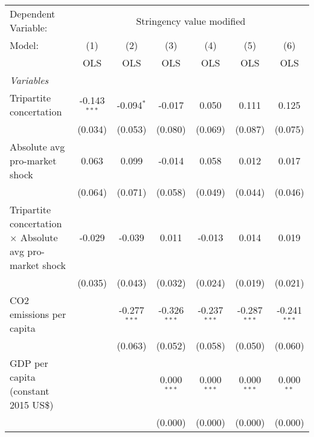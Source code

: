 
\begingroup
\centering
\begin{tabular}{lcccccc}
   \toprule
   Dependent Variable: & \multicolumn{6}{c}{Stringency value modified}\\
   Model:                                                          & (1)            & (2)            & (3)            & (4)            & (5)            & (6)\\  
                                                                   &  OLS           & OLS            & OLS            & OLS            & OLS            & OLS\\  
   \midrule
   \emph{Variables}\\
   Tripartite concertation                                         & -0.143$^{***}$ & -0.094$^{*}$   & -0.017         & 0.050          & 0.111          & 0.125\\   
                                                                   & (0.034)        & (0.053)        & (0.080)        & (0.069)        & (0.087)        & (0.075)\\   
   Absolute avg pro-market shock                                   & 0.063          & 0.099          & -0.014         & 0.058          & 0.012          & 0.017\\   
                                                                   & (0.064)        & (0.071)        & (0.058)        & (0.049)        & (0.044)        & (0.046)\\   
   Tripartite concertation $\times$ Absolute avg pro-market shock  & -0.029         & -0.039         & 0.011          & -0.013         & 0.014          & 0.019\\   
                                                                   & (0.035)        & (0.043)        & (0.032)        & (0.024)        & (0.019)        & (0.021)\\   
   CO2 emissions per capita                                        &                & -0.277$^{***}$ & -0.326$^{***}$ & -0.237$^{***}$ & -0.287$^{***}$ & -0.241$^{***}$\\   
                                                                   &                & (0.063)        & (0.052)        & (0.058)        & (0.050)        & (0.060)\\   
   GDP per capita (constant 2015 US\$)                             &                &                & 0.000$^{***}$  & 0.000$^{***}$  & 0.000$^{***}$  & 0.000$^{**}$\\   
                                                                   &                &                & (0.000)        & (0.000)        & (0.000)        & (0.000)\\   

\end{tabular}
